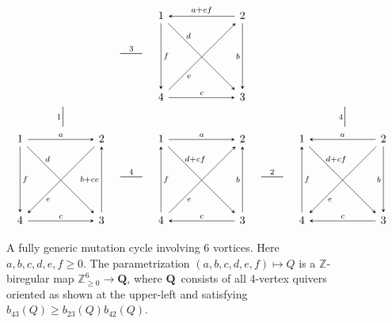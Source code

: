 \documentclass[11pt, letterpaper]{amsart}
\theoremstyle{definition}
\numberwithin{equation}{section}
\def\ZZ{{\mathbb Z}}
\newcommand{\mutation}[1]{\stackrel{#1}{\rule[.5ex]{2em}{0.5pt}}}
\newcommand{\vmutation}[1]{  {\scriptstyle #1}{\Bigl|\Bigr.}  }
\begin{document}
\begin{figure}[ht]
\begin{equation*}
\begin{array}{ccccc}
 & \mutation 3 
 &  \begin{tikzcd}[arrows={-stealth}, column sep=60, row sep=60]
  1  \arrow[r,  "a+ef", \snsl] \arrow[dr, "d" near start, outer sep=-.8, \sns]  \arrow[d, "f", \sns]  
  & 2  \arrow[d, swap, "b", \sns] \arrow[dl, "e", near end, outer sep=-.8, \snsl]
  \\
   4 
   & 3  \arrow[l, "c", swap, \snsl] 
\end{tikzcd}
\\
\\[-10pt]
\vmutation{1}   & & & & \vmutation{4} \\[7pt]
\begin{tikzcd}[arrows={-stealth}, column sep=60, row sep=60]
  1  \arrow[r,  "a", \sns] \arrow[dr, "d" near start, outer sep=-.8, \sns]  \arrow[d, "f", \sns]  
  & 2  \arrow[d, swap, "b+ce", \snsl] \arrow[dl, "e", near end, outer sep=-.8, \sns]
  \\
   4 
   & 3  \arrow[l, "c", swap, \snsl] 
\end{tikzcd}
& \mutation 4 
&  \begin{tikzcd}[arrows={-stealth}, column sep=60, row sep=60]
  1  \arrow[r,  "a", \sns] \arrow[dr, "d+cf" near start, outer sep=-2, \sns]  \arrow[d, "f", \snsl]  
  & 2  \arrow[d, swap, "b", \snsl] \arrow[dl, "e", near end, outer sep=-.8, \snsl]
  \\
   4 
   & 3  \arrow[l, "c", swap, \sns] 
\end{tikzcd}
& \mutation 2 
& \begin{tikzcd}[arrows={-stealth}, column sep=60, row sep=60]
  1  \arrow[r,  "a", \snsl] \arrow[dr, "d+cf" near start, outer sep=-2, \sns]  \arrow[d, "f", \snsl]  
  & 2  \arrow[d, swap, "b", \sns] \arrow[dl, "e", near end, outer sep=-.8, \sns]
  \\
   4 
   & 3  \arrow[l, "c", swap, \sns] 
\end{tikzcd}
\end{array}
\end{equation*}
\vspace{-.1in}
\caption{A fully generic mutation cycle involving 6 vortices.
Here ${a,b,c,d,e,f \geq 0}$. 
The parametrization $(a,b,c,d,e,f)\mapsto Q$ 
is a $\ZZ$-biregular map $\ZZ_{\ge0}^6\to\mathbf{Q}$, 
where $\mathbf{Q}$~consists of all 4-vertex quivers oriented as shown at the upper-left
and satisfying $b_{43}(Q)\ge b_{23}(Q)b_{42}(Q)$. 
}
\label{fig:generic-6-cycle}
\vspace{-.2in}
\end{figure}
\end{document}
